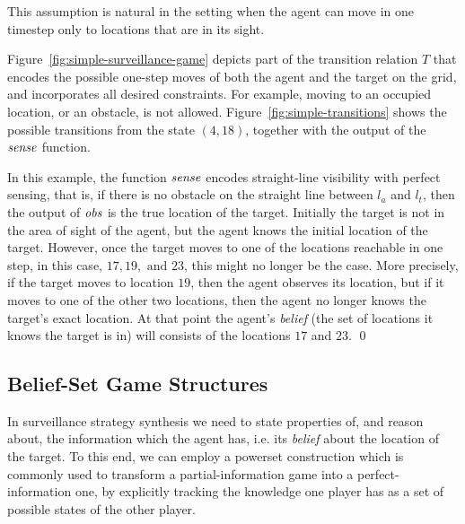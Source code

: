 This assumption is natural in the setting when the agent can move in one timestep only to locations that are in its sight.

\bigskip
\begin{eg}\label{ex:simple-surveillance-game}
Figure~\ref{fig:simple-surveillance-game} depicts part of the transition relation $T$ that encodes the possible one-step moves of both the agent and the target on the grid, and incorporates all desired constraints. For example, moving to an occupied location, or an obstacle, is not allowed. Figure~\ref{fig:simple-transitions} shows the possible transitions from the state $(4,18)$, together with the output of the $\mathit{sense}$ function.

In this example, the function $\mathit{sense}$ encodes straight-line visibility with perfect sensing, that is,  if there is no obstacle on the straight line between $l_a$ and $l_t$, then the output of $\mathit{obs}$ is the true location of the target. Initially the target is not in the area of sight of the agent, but the agent knows the initial location of the target. However, once the target moves to one of the locations reachable in one step, in this case, $17,19,\text{ and }23$, this might no longer be the case. More precisely, if the target moves to location $19$, then the agent observes its location, but if it moves to one of the other two locations, then the agent no longer knows the target's exact location. At that point the agent's \emph{belief} (the set of locations it knows the target is in) will consists of the locations $17$ and $23$.
\qed
\end{eg}



\subsection{Belief-Set Game Structures}

In surveillance strategy synthesis we need to state properties of, and reason about, the information which the agent has, i.e. its \emph{belief} about the location of the target. To this end, we can employ a powerset construction which is commonly used to transform a partial-information game into a perfect-information one, by explicitly tracking the knowledge one player has as a set of possible states of the other player.

\bigskip

